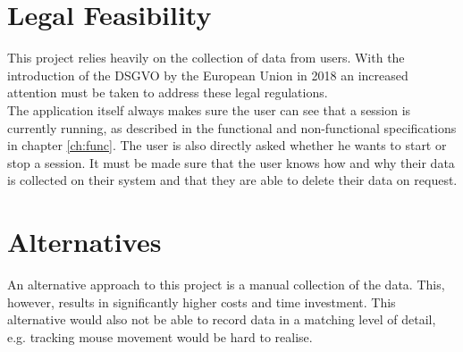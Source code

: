 \section{Legal Feasibility}
\label{Legal Feasibility}
This project relies heavily on the collection of data from \glspl{user}. With the introduction of the DSGVO by the European Union in 2018 an increased attention must be taken to address these legal regulations.\\
The application itself always makes sure the \gls{user} can see that a \gls{session} is currently running, as described in the functional and non-functional specifications in chapter \ref{ch:func}. The \gls{user} is also directly asked whether he wants to start or stop a \gls{session}.
It must be made sure that the \gls{user} knows how and why their data is collected on their system and that they are able to delete their data on request.

\section{Alternatives}
\label{Alternatives}
An alternative approach to this project is a manual collection of the data. This, however, results in significantly higher costs and time investment. This alternative would also not be able to record data in a matching level of detail, e.g. tracking mouse movement would be hard to realise.

